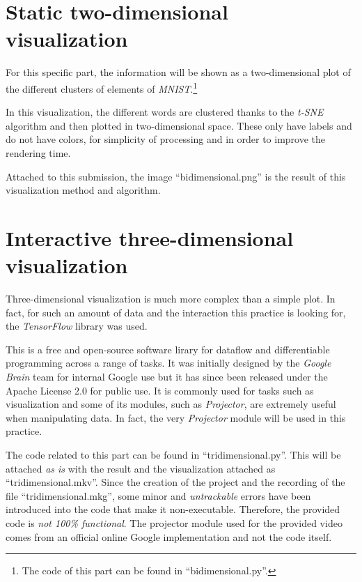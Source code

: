 \documentclass[a4paper]{article}
\begin{document}

\section*{Static two-dimensional visualization}

For this specific part, the information will be shown as a two-dimensional plot
of the different clusters of elements of \textit{MNIST}.\footnote{The code of
this part can be found in ``bidimensional.py''.} 

In this visualization, the different words are clustered thanks to the
\textit{t-SNE} algorithm and then plotted in two-dimensional space. These only
have labels and do not have colors, for simplicity of processing and in order to
improve the rendering time.

Attached to this submission, the image ``bidimensional.png'' is the result of
this visualization method and algorithm.


\section*{Interactive three-dimensional visualization}

Three-dimensional visualization is much more complex than a simple plot. In
fact, for such an amount of data and the interaction this practice is looking
for, the \textit{TensorFlow} library was used.

This is a free and open-source software lirary for dataflow and differentiable
programming across a range of tasks. It was initially designed by the
\textit{Google Brain} team for internal Google use but it has since been
released under the Apache License 2.0 for public use. It is commonly used for
tasks such as visualization and some of its modules, such as \textit{Projector},
are extremely useful when manipulating data. In fact, the very
\textit{Projector} module will be used in this practice.

The code related to this part can be found in ``tridimensional.py''. This will
be attached \textit{as is} with the result and the visualization attached as
``tridimensional.mkv''. Since the creation of the project and the recording of
the file ``tridimensional.mkg'', some minor and \textit{untrackable} errors have
been introduced into the code that make it non-executable. Therefore, the
provided code is \textit{not 100\% functional}. The projector module used for
the provided video comes from an official online Google implementation and not
the code itself.
\end{document}
